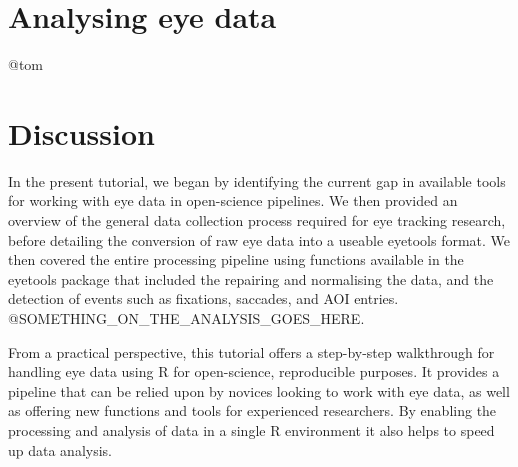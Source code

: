 \documentclass[
  man,
  floatsintext,
  longtable,
  nolmodern,
  notxfonts,
  notimes,
  colorlinks=true,linkcolor=blue,citecolor=blue,urlcolor=blue]{apa7}
\begin{document}
\begin{figure}[H]
\begin{minipage}{0.33\linewidth}
\subcaption{\label{fig-spatial-sac}}


\end{minipage}%

\end{figure}%

\section{Analysing eye data}\label{analysing-eye-data}

@tom

\section{Discussion}\label{discussion}

In the present tutorial, we began by identifying the current gap in
available tools for working with eye data in open-science pipelines. We
then provided an overview of the general data collection process
required for eye tracking research, before detailing the conversion of
raw eye data into a useable eyetools format. We then covered the entire
processing pipeline using functions available in the eyetools package
that included the repairing and normalising the data, and the detection
of events such as fixations, saccades, and AOI entries.
@SOMETHING\_ON\_THE\_ANALYSIS\_GOES\_HERE.

From a practical perspective, this tutorial offers a step-by-step
walkthrough for handling eye data using R for open-science, reproducible
purposes. It provides a pipeline that can be relied upon by novices
looking to work with eye data, as well as offering new functions and
tools for experienced researchers. By enabling the processing and
analysis of data in a single R environment it also helps to speed up
data analysis.
\end{document}
